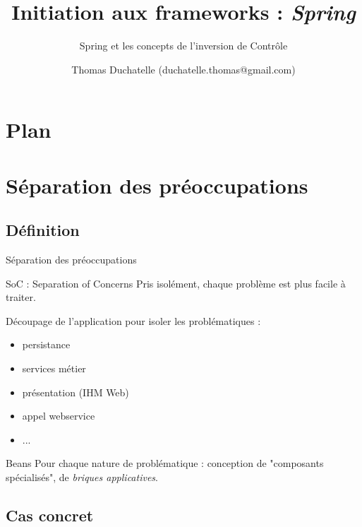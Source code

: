 \documentclass[compress]{beamer}%
\title{Initiation aux frameworks : \emph{Spring}}
\subtitle{Spring et les concepts de l'inversion de Contrôle}
\author{Thomas Duchatelle (duchatelle.thomas@gmail.com)}
\institute{Capgemini, pour Yves Rocher}
\begin{document}
\frame{\titlepage}
  
\section*{Plan}
\frame{\tableofcontents[hideallsubsections]}
	
\section{Séparation des préoccupations}

\subsection{Définition}

\begin{frame}{Séparation des préoccupations}
	
	\begin{block}{SoC : Separation of Concerns}
	Pris isolément, chaque problème est plus facile à traiter.
	\end{block}

	\pause
	Découpage de l'application pour isoler les problématiques :
	\begin{itemize}
	\item persistance
	\item services métier
	\item présentation (IHM Web)
	\item appel webservice
	\item ...
	\end{itemize}
	
	\pause
	\begin{block}{Beans}
	Pour chaque nature de problématique : conception de "composants spécialisés", de \emph{briques applicatives}.
	\end{block}
\end{frame}

\subsection{Cas concret}
\end{document}
